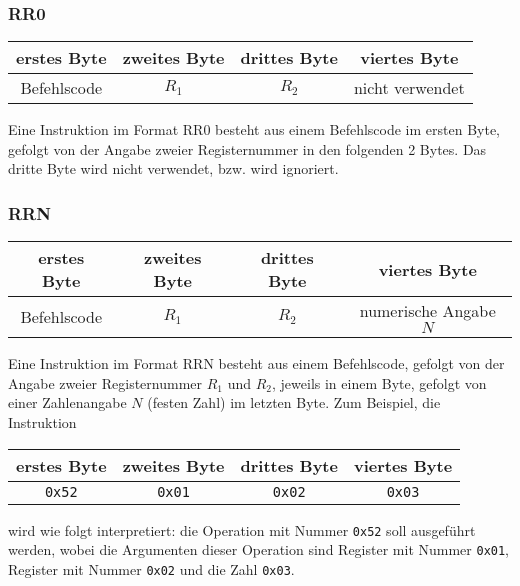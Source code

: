 \subsubsection{RR0}
\label{RR0}

\begin{center}
  \begin{tabular}{|*{4}{c|}} \hline
    erstes Byte  & zweites Byte  & drittes Byte  & viertes Byte \\\hline\hline
    Befehlscode  & $R_{1}$       & $R_{2}$ &  nicht verwendet   \\\hline
  \end{tabular}
\end{center}
Eine Instruktion im Format RR0 besteht aus einem Befehlscode im ersten Byte,
gefolgt von der Angabe zweier Registernummer in den folgenden 2 Bytes. Das
dritte Byte wird nicht verwendet, bzw. wird ignoriert.


\subsubsection{RRN}
\label{RRN}

\begin{center}
  \begin{tabular}{|*{4}{c|}} \hline
    erstes Byte  & zweites Byte  & drittes Byte  & viertes Byte \\\hline\hline
    Befehlscode  & $R_{1}$       & $R_{2}$ & numerische Angabe $N$  \\\hline
  \end{tabular}
\end{center}
Eine Instruktion im Format RRN besteht aus einem Befehlscode, gefolgt von der
Angabe zweier Registernummer $R_{1}$ und $R_{2}$, jeweils in einem Byte, gefolgt
von einer Zahlenangabe $N$ (festen Zahl) im letzten Byte. Zum Beispiel, die
Instruktion
\begin{center}
  \begin{tabular}{|*{4}{c|}} \hline
    erstes Byte & zweites Byte  & drittes Byte  & viertes Byte \\\hline\hline
    \texttt{0x52} & \texttt{0x01} & \texttt{0x02} & \texttt{0x03} \\\hline
  \end{tabular}
\end{center}
wird wie folgt interpretiert: 
die Operation mit Nummer \texttt{0x52} soll ausgeführt werden, wobei die
Argumenten dieser Operation sind Register mit Nummer \texttt{0x01}, Register mit
Nummer \texttt{0x02} und die Zahl \texttt{0x03}.



